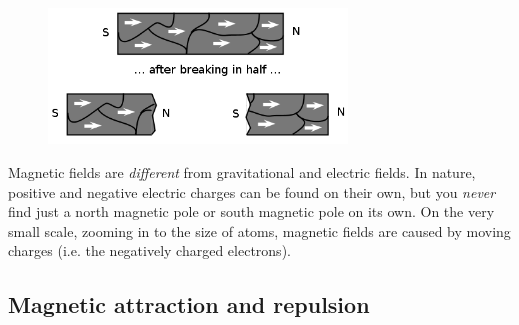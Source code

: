     \setcounter{subfigure}{0}


	\begin{figure}[H] %
    \begin{center}
    \label{m37830*id128731!!!underscore!!!media}\label{m37830*id128731!!!underscore!!!printimage}\includegraphics[width=300px]{col11305.imgs/m37830_PG10C7_004.png} %
        
      \vspace{2pt}
    \vspace{.1in}
    
    \end{center}

 \end{figure}   

    \addtocounter{footnote}{-0}
    
        \par 
        \label{m37830*id128737}Magnetic fields are \textsl{different} from gravitational and electric
fields. In nature, positive and negative electric charges can be found
on their own, but you \textsl{never} find just a north magnetic pole or south magnetic pole on its
own. On the very small scale, zooming in to the size of atoms, magnetic fields are caused by
moving charges (i.e. the negatively charged electrons).\par 
      
      \label{m37830*uid17}
            \subsection{ Magnetic attraction and repulsion}
            \nopagebreak
            
